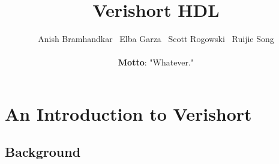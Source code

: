 \documentclass[letterpaper,11pt]{article}
\begin{document}
\title{Verishort HDL}
\author{Anish Bramhandkar \ Elba Garza \ Scott Rogowski \ Ruijie Song\\\\
\textbf{Motto}: "Whatever."}
\renewcommand{\today}{December 22, 2010}
\maketitle

\newpage

\tableofcontents

\newpage

\section{An Introduction to Verishort}
    \subsection{Background}
    
\end{document}
